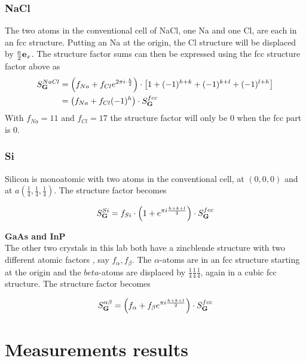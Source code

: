 \documentclass[a4paper,twoside=false,abstract=false,numbers=noenddot,
titlepage=false,headings=small,parskip=half,version=last]{scrartcl}
\begin{document}
\subsubsection{NaCl}
The two atoms in the conventional cell of NaCl, one Na and one Cl, are each in an fcc structure.
Putting an Na at the origin, the Cl structure will be displaced by $\frac{a}{2}\bold{e}_x$.
The structure factor sums can then be expressed using the fcc structure factor above as
\begin{align}
    S^{NaCl}_{\bold{G}}
    &= \left( f_{Na} + f_{Cl}e^{2\pi i\cdot \frac{h}{2}} \right) \cdot \left[ 1 + (-1)^{h+k} + (-1)^{k+l} + (-1)^{l+h}\right]\nonumber\\
    &= \left( f_{Na} + f_{Cl}(-1)^{h} \right) \cdot S^{fcc}_{\bold{G}}
\end{align}\label{naclstructure}
With $f_{Na}=11$ and $f_{Cl}=17$ the structure factor will only be $0$ when the fcc part is $0$.
\subsubsection{Si}
Silicon is monoatomic with two atoms in the conventional cell, at $(0,0,0)$ and at $a(\frac{1}{4},\frac{1}{4},\frac{1}{4})$.
The structure factor becomes

\begin{equation}
    \label{eq:sistructure}
    S^{Si}_{\bold{G}}
    = f_{Si}\cdot \left( 1 + e^{\pi i \frac{h+k+l}{2}} \right) \cdot S^{fcc}_{\bold{G}}
\end{equation}

\textbf{GaAs and InP}\\
The other two crystals in this lab both have a zincblende structure with two different atomic factors , say $f_\alpha,f_\beta$.
The $\alpha$-atoms are in an fcc structure starting at the origin and the $beta$-atoms are displaced by $\frac{1}{4}\frac{1}{4}\frac{1}{4}$, again in a cubic fcc structure.
The structure factor becomes

\begin{equation}
    \label{eq:zincblendestructure}
    S^{\alpha\beta}_{\bold{G}}
    = \left( f_\alpha + f_\beta e^{\pi i \frac{h+k+l}{2}} \right) \cdot S^{fcc}_{\bold{G}}
\end{equation}

\section{Measurements results}
\end{document}

